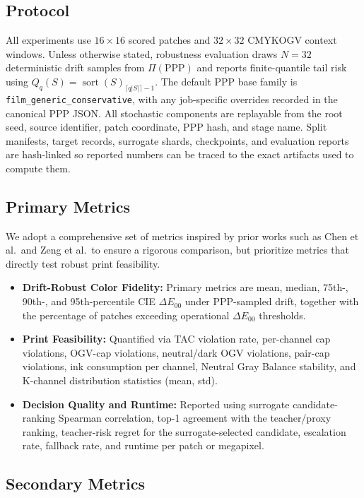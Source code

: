 \documentclass[11pt]{article}
\begin{document}
\subsection{Protocol}

All experiments use $16\times16$ scored patches and $32\times32$ CMYKOGV context windows. Unless otherwise stated, robustness evaluation draws $N=32$ deterministic drift samples from $\Pi(\mathrm{PPP})$ and reports finite-quantile tail risk using $Q_q(S)=\operatorname{sort}(S)_{\lceil q|S|\rceil-1}$. The default PPP base family is \texttt{film\_generic\_conservative}, with any job-specific overrides recorded in the canonical PPP JSON. All stochastic components are replayable from the root seed, source identifier, patch coordinate, PPP hash, and stage name. Split manifests, target records, surrogate shards, checkpoints, and evaluation reports are hash-linked so reported numbers can be traced to the exact artifacts used to compute them.

\subsection{Primary Metrics}

We adopt a comprehensive set of metrics inspired by prior works such as Chen et al.\ and Zeng et al.\ to ensure a rigorous comparison, but prioritize metrics that directly test robust print feasibility.

\begin{itemize}
    \item \textbf{Drift-Robust Color Fidelity:} Primary metrics are mean, median, 75th-, 90th-, and 95th-percentile CIE $\Delta E_{00}$ under PPP-sampled drift, together with the percentage of patches exceeding operational $\Delta E_{00}$ thresholds.
    \item \textbf{Print Feasibility:} Quantified via TAC violation rate, per-channel cap violations, OGV-cap violations, neutral/dark OGV violations, pair-cap violations, ink consumption per channel, Neutral Gray Balance stability, and K-channel distribution statistics (mean, std).
    \item \textbf{Decision Quality and Runtime:} Reported using surrogate candidate-ranking Spearman correlation, top-1 agreement with the teacher/proxy ranking, teacher-risk regret for the surrogate-selected candidate, escalation rate, fallback rate, and runtime per patch or megapixel.
\end{itemize}

\subsection{Secondary Metrics}
\end{document}

